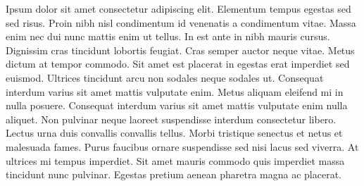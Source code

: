 \documentclass[12pt]{article}
\begin{document}
		Ipsum dolor sit amet consectetur adipiscing elit. Elementum tempus egestas sed sed risus. Proin nibh nisl condimentum id venenatis a condimentum vitae. Massa enim nec dui nunc mattis enim ut tellus. In est ante in nibh mauris cursus. Dignissim cras tincidunt lobortis feugiat. Cras semper auctor neque vitae. Metus dictum at tempor commodo. Sit amet est placerat in egestas erat imperdiet sed euismod. Ultrices tincidunt arcu non sodales neque sodales ut. Consequat interdum varius sit amet mattis vulputate enim. Metus aliquam eleifend mi in nulla posuere. Consequat interdum varius sit amet mattis vulputate enim nulla aliquet. Non pulvinar neque laoreet suspendisse interdum consectetur libero. Lectus urna duis convallis convallis tellus. Morbi tristique senectus et netus et malesuada fames. Purus faucibus ornare suspendisse sed nisi lacus sed viverra. At ultrices mi tempus imperdiet. Sit amet mauris commodo quis imperdiet massa tincidunt nunc pulvinar. Egestas pretium aenean pharetra magna ac placerat.
		
\end{document}

